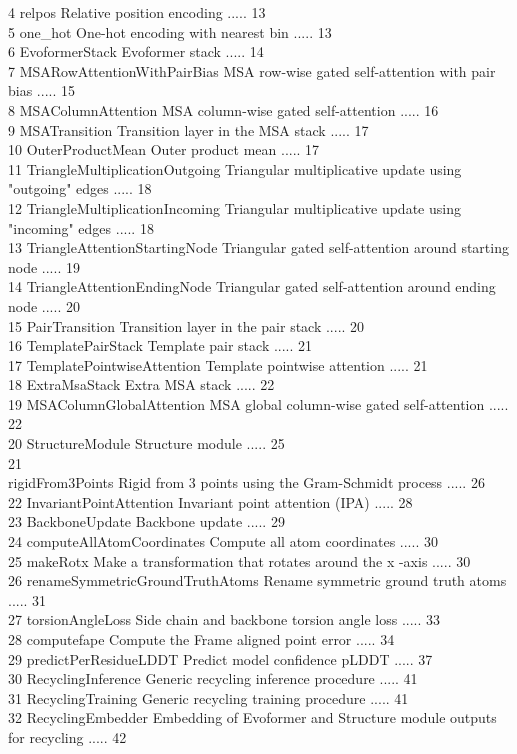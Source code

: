 \documentclass[10pt]{article}
\begin{document}
4 relpos Relative position encoding ..... 13\\
5 one\_hot One-hot encoding with nearest bin ..... 13\\
6 EvoformerStack Evoformer stack ..... 14\\
7 MSARowAttentionWithPairBias MSA row-wise gated self-attention with pair bias ..... 15\\
8 MSAColumnAttention MSA column-wise gated self-attention ..... 16\\
9 MSATransition Transition layer in the MSA stack ..... 17\\
10 OuterProductMean Outer product mean ..... 17\\
11 TriangleMultiplicationOutgoing Triangular multiplicative update using "outgoing" edges ..... 18\\
12 TriangleMultiplicationIncoming Triangular multiplicative update using "incoming" edges ..... 18\\
13 TriangleAttentionStartingNode Triangular gated self-attention around starting node ..... 19\\
14 TriangleAttentionEndingNode Triangular gated self-attention around ending node ..... 20\\
15 PairTransition Transition layer in the pair stack ..... 20\\
16 TemplatePairStack Template pair stack ..... 21\\
17 TemplatePointwiseAttention Template pointwise attention ..... 21\\
18 ExtraMsaStack Extra MSA stack ..... 22\\
19 MSAColumnGlobalAttention MSA global column-wise gated self-attention ..... 22\\
20 StructureModule Structure module ..... 25\\
21\\
rigidFrom3Points Rigid from 3 points using the Gram-Schmidt process ..... 26\\
22 InvariantPointAttention Invariant point attention (IPA) ..... 28\\
23 BackboneUpdate Backbone update ..... 29\\
24 computeAllAtomCoordinates Compute all atom coordinates ..... 30\\
25 makeRotx Make a transformation that rotates around the x -axis ..... 30\\
26 renameSymmetricGroundTruthAtoms Rename symmetric ground truth atoms ..... 31\\
27 torsionAngleLoss Side chain and backbone torsion angle loss ..... 33\\
28 computefape Compute the Frame aligned point error ..... 34\\
29 predictPerResidueLDDT Predict model confidence pLDDT ..... 37\\
30 RecyclingInference Generic recycling inference procedure ..... 41\\
31 RecyclingTraining Generic recycling training procedure ..... 41\\
32 RecyclingEmbedder Embedding of Evoformer and Structure module outputs for recycling ..... 42
\end{document}
